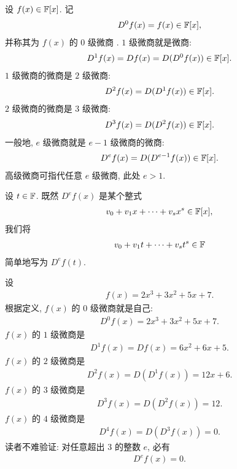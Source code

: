 \begin{definition}
    设 $f(x) \in \mathbb{F}[x]$. 记
    \begin{align*}
        D^0 f(x) = f(x) \in \mathbb{F}[x],
    \end{align*}
    并称其为 $f(x)$ 的 $0$ 级微商 . $1$ 级微商就是微商:
    \begin{align*}
        D^1 f(x) = D f(x) = D (D^0 f(x)) \in \mathbb{F}[x].
    \end{align*}
    $1$ 级微商的微商是 $2$ 级微商:
    \begin{align*}
        D^2 f(x) = D (D^1 f(x)) \in \mathbb{F}[x].
    \end{align*}
    $2$ 级微商的微商是 $3$ 级微商:
    \begin{align*}
        D^3 f(x) = D (D^2 f(x)) \in \mathbb{F}[x].
    \end{align*}
    一般地, $e$ 级微商就是 $e - 1$ 级微商的微商:
    \begin{align*}
        D^e f(x) = D (D^{e-1} f(x)) \in \mathbb{F}[x].
    \end{align*}
    高级微商可指代任意 $e$ 级微商, 此处 $e > 1$.

    设 $t \in \mathbb{F}$. 既然 $D^e f(x)$ 是某个整式
    \begin{align*}
        v_0 + v_1 x + \cdots + v_s x^s \in \mathbb{F}[x],
    \end{align*}
    我们将
    \begin{align*}
        v_0 + v_1 t + \cdots + v_s t^s \in \mathbb{F}
    \end{align*}
    简单地写为 $D^e f(t)$.
\end{definition}

\begin{example}
    设
    \begin{align*}
        f(x) = 2x^3 + 3x^2 + 5x + 7.
    \end{align*}
    根据定义, $f(x)$ 的 $0$ 级微商就是自己:
    \begin{align*}
        D^0 f(x) = 2x^3 + 3x^2 + 5x + 7.
    \end{align*}
    $f(x)$ 的 $1$ 级微商是
    \begin{align*}
        D^1 f(x) = Df(x) = 6x^2 + 6x + 5.
    \end{align*}
    $f(x)$ 的 $2$ 级微商是
    \begin{align*}
        D^2 f(x) = D(D^1 f(x)) = 12x + 6.
    \end{align*}
    $f(x)$ 的 $3$ 级微商是
    \begin{align*}
        D^3 f(x) = D(D^2 f(x)) = 12.
    \end{align*}
    $f(x)$ 的 $4$ 级微商是
    \begin{align*}
        D^4 f(x) = D(D^3 f(x)) = 0.
    \end{align*}
    读者不难验证: 对任意超出 $3$ 的整数 $e$, 必有
    \begin{align*}
        D^e f(x) = 0.
    \end{align*}
\end{example}

